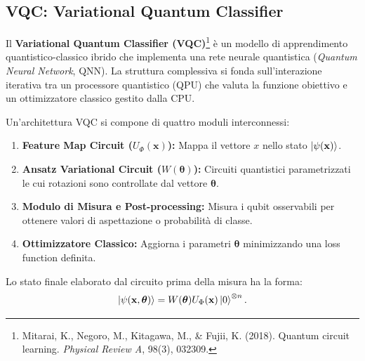 \subsection{VQC: Variational Quantum Classifier}
Il \textbf{Variational Quantum Classifier (VQC)}\footnote{Mitarai, K., Negoro, M., Kitagawa, M., \& Fujii, K. (2018). Quantum circuit learning. \textit{Physical Review A}, 98(3), 032309.} è un modello di apprendimento quantistico-classico ibrido che implementa una rete neurale quantistica (\textit{Quantum Neural Network}, QNN). La struttura complessiva si fonda sull'interazione iterativa tra un processore quantistico (QPU) che valuta la funzione obiettivo e un ottimizzatore classico gestito dalla CPU.

Un'architettura VQC si compone di quattro moduli interconnessi:
\begin{enumerate}
    \item \textbf{Feature Map Circuit ($U_{\Phi}(\mathbf{x})$):} Mappa il vettore $x$ nello stato $\ket{\psi(\mathbf{x})}$.
    \item \textbf{Ansatz Variational Circuit ($W(\boldsymbol{\theta})$):} Circuiti quantistici parametrizzati le cui rotazioni sono controllate dal vettore $\boldsymbol{\theta}$.
    \item \textbf{Modulo di Misura e Post-processing:} Misura i qubit osservabili per ottenere valori di aspettazione o probabilità di classe.
    \item \textbf{Ottimizzatore Classico:} Aggiorna i parametri $\boldsymbol{\theta}$ minimizzando una loss function definita.
\end{enumerate}

Lo stato finale elaborato dal circuito prima della misura ha la forma:
\begin{equation}
\ket{\psi(\mathbf{x}, \boldsymbol{\theta})} = W(\boldsymbol{\theta}) U_{\Phi}(\mathbf{x}) \ket{0}^{\otimes n}.
\end{equation}

